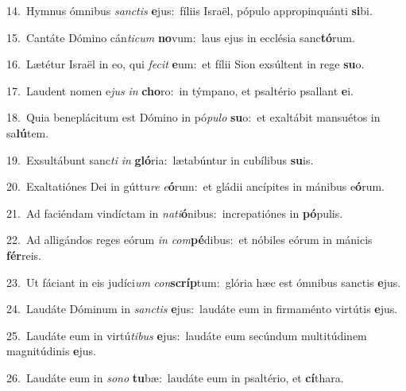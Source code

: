 {\numbfont\textcolor{\numbcolor}{14.}}~Hymnus ómnibus \textit{sanc}\-\textit{tis} \textbf{e}\-jus:~\star fíliis Israël, pópulo appropinquánti \textbf{si}\-bi.\par
{\numbfont\textcolor{\numbcolor}{15.}}~Cantáte Dómino cán\-\textit{ti}\-\textit{cum} \textbf{no}\-vum:~\star laus ejus in ecclésia sanc\-\textbf{tó}\-rum.\par
{\numbfont\textcolor{\numbcolor}{16.}}~Lætétur Israël in eo, qui \textit{fe}\-\textit{cit} \textbf{e}\-um:~\star et fílii Sion exsúltent in rege \textbf{su}\-o.\par
{\numbfont\textcolor{\numbcolor}{17.}}~Laudent nomen e\textit{jus} \textit{in} \textbf{cho}\-ro:~\star in týmpano, et psaltério psallant \textbf{e}\-i.\par
{\numbfont\textcolor{\numbcolor}{18.}}~Quia beneplácitum est Dómino in pó\-\textit{pu}\-\textit{lo} \textbf{su}\-o:~\star et exaltábit mansuétos in sa\-\textbf{lú}\-tem.\par
{\numbfont\textcolor{\numbcolor}{19.}}~Exsultábunt sanc\textit{ti} \textit{in} \textbf{gló}\-ria:~\star lætabúntur in cubílibus \textbf{su}\-is.\par
{\numbfont\textcolor{\numbcolor}{20.}}~Exaltatiónes Dei in gúttu\textit{re} \textit{e}\-\textbf{ó}rum:~\star et gládii ancípites in mánibus e\-\textbf{ó}\-rum.\par
{\numbfont\textcolor{\numbcolor}{21.}}~Ad faciéndam vindíctam in \textit{na}\-\textit{ti}\textbf{ó}nibus:~\star increpatiónes in \textbf{pó}\-pulis.\par
{\numbfont\textcolor{\numbcolor}{22.}}~Ad alligándos reges eórum \textit{in} \textit{com}\-\textbf{pé}dibus:~\star et nóbiles eórum in mánicis \textbf{fér}\-reis.\par
{\numbfont\textcolor{\numbcolor}{23.}}~Ut fáciant in eis judíci\textit{um} \textit{con}\-\textbf{scríp}tum:~\star glória hæc est ómnibus sanctis \textbf{e}\-jus.\par
{\numbfont\textcolor{\numbcolor}{24.}}~Laudáte Dóminum in \textit{sanc}\-\textit{tis} \textbf{e}\-jus:~\star laudáte eum in firmaménto virtútis \textbf{e}\-jus.\par
{\numbfont\textcolor{\numbcolor}{25.}}~Laudáte eum in virtú\-\textit{ti}\-\textit{bus} \textbf{e}\-jus:~\star laudáte eum secúndum multitúdinem magnitúdinis \textbf{e}\-jus.\par
{\numbfont\textcolor{\numbcolor}{26.}}~Laudáte eum in \textit{so}\-\textit{no} \textbf{tu}\-bæ:~\star laudáte eum in psaltério, et \textbf{cí}\-thara.\par
